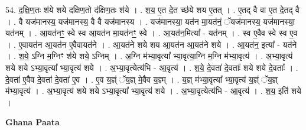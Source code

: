 \documentclass[17pt]{extarticle}
\begin{document}
54. द॒क्षि॒ण॒तः श॑ये शये दक्षिण॒तो द॑क्षिण॒तः श॑ये । . श॒य॒ ए॒त दे॒त च्छ॑ये शय ए॒तत् । . ए॒तद् वै वा ए॒त दे॒तद् वै । . वै यज॑मानस्य॒ यज॑मानस्य॒ वै वै यज॑मानस्य । . यज॑मानस्या॒ यत॑न मा॒यत॑नं॒ ॅयज॑मानस्य॒ यज॑मानस्या॒ यत॑नम् । . आ॒यत॑नꣳ॒॒ स्वे स्व आ॒यत॑न मा॒यत॑नꣳ॒॒ स्वे । . आ॒यत॑न॒मित्या᳚ - यत॑नम् । . स्व ए॒वैव स्वे स्व ए॒व । . ए॒वायत॑न आ॒यत॑न ए॒वैवायत॑ने । . आ॒यत॑ने शये शय आ॒यत॑न आ॒यत॑ने शये । . आ॒यत॑न॒ इत्या᳚ - यत॑ने । . श॒ये॒ ऽग्नि म॒ग्निꣳ श॑ये शये॒ ऽग्निम् । . अ॒ग्नि म॑भ्या॒वृत्या᳚ भ्या॒वृत्या॒ग्नि म॒ग्नि म॑भ्या॒वृत्य॑ । . अ॒भ्या॒वृत्य॑ शये शये ऽभ्या॒वृत्या᳚ भ्या॒वृत्य॑ शये । . अ॒भ्या॒वृत्येत्य॑भि - आ॒वृत्य॑ । . श॒ये॒ दे॒वता॑ दे॒वताः᳚ शये शये दे॒वताः᳚ । . दे॒वता॑ ए॒वैव दे॒वता॑ दे॒वता॑ ए॒व । . ए॒व य॒ज्ञ्ं ॅय॒ज्ञ् मे॒वैव य॒ज्ञ्म् । . य॒ज्ञ् म॑भ्या॒वृत्या᳚ भ्या॒वृत्य॑ य॒ज्ञ्ं ॅय॒ज्ञ् म॑भ्या॒वृत्य॑ । . अ॒भ्या॒वृत्य॑ शये शये ऽभ्या॒वृत्या᳚ भ्या॒वृत्य॑ शये । . अ॒भ्या॒वृत्येत्य॑भि - आ॒वृत्य॑ । . श॒य॒ इति॑ शये । \newline

\textbf{Ghana Paata } \newline
\end{document}
